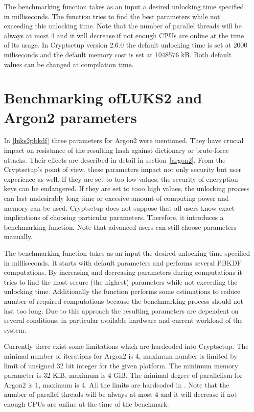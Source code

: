 \documentclass[nolof]{fithesis3}
\begin{document}
The benchmarking function takes as an input a desired unlocking time specified in milliseconds. The function tries to find the best parameters while not exceeding this unlocking time. Note that the number of parallel threads will be always at most 4 and it will decrease if not enough CPUs are online at the time of its usage. In Cryptsetup version 2.6.0 the default unlocking time is set at 2000 miliseconds and the default memory cost is set at 1048576 kB. Both default values can be changed at compilation time.

\section{Benchmarking ofLUKS2 and Argon2 parameters}
\label{sec:benchmark}
In \ref{luks2pbkdf} three parameters for Argon2 were mentioned. They have crucial impact on resistance of the resulting hash against dictionary or brute-force attacks. Their effects are described in detail in section~\ref{argon2}. From the Cryptsetup's point of view, these parameters impact not only security but  user experience as well. If they are set to too low values, the security of encryption keys can be endangered. If they are set to tooo high values, the unlocking process can last undesirably long time or  excesive amount of computing power and memory can be used. Cryptsetup does not suppose that all users know exact implications of choosing particular parameters. Therefore, it introduces a benchmarking function. Note that advanced users can still choose parameters manually.

The benchmarking function takes as an input the desired unlocking time specified in milliseconds. It starts with default parameters and performs several PBKDF computations. By increasing and decreasing parameters during computations it tries to find the most secure (the highest) parameters while not exceeding the unlocking time. Additionally the function performs some estimations to reduce number of required computations because the benchmarking process should not last too long. Due to this approach the resulting parameters are dependent on several conditions, in particular available hardware and current workload of the system.

Currently there exist some limitations which are hardcoded into Cryptsetup. The minimal number of iterations for Argon2 is 4, maximum number is limited by limit of unsigned 32 bit integer for the given platform. The minimum memory parameter is 32 KiB, maximum is 4 GiB. The minimal degree of parallelism for Argon2 is 1, maximum is 4. All the limits are hardcoded in \parencite{cryptsetupgitpbkdfcheck}. Note that the number of parallel threads will be always at most 4 and it will decrease if not enough CPUs are online at the time of the benchmark.
\end{document}
